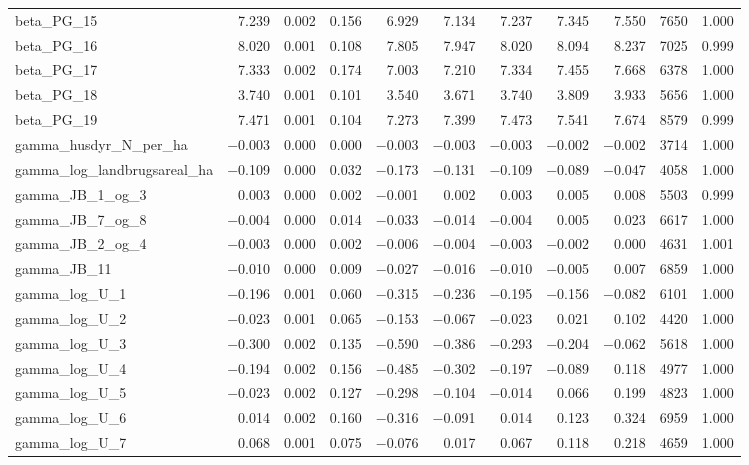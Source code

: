 \documentclass[12pt]{article}
\begin{document}
\begin{longtable}{lrrrrrrrrrr}
beta\_PG\_15 & 7.239 & 0.002 & 0.156 & 6.929 & 7.134 & 7.237 & 7.345 & 7.550 & 7650 & 1.000 \\
beta\_PG\_16 & 8.020 & 0.001 & 0.108 & 7.805 & 7.947 & 8.020 & 8.094 & 8.237 & 7025 & 0.999 \\
beta\_PG\_17 & 7.333 & 0.002 & 0.174 & 7.003 & 7.210 & 7.334 & 7.455 & 7.668 & 6378 & 1.000 \\
beta\_PG\_18 & 3.740 & 0.001 & 0.101 & 3.540 & 3.671 & 3.740 & 3.809 & 3.933 & 5656 & 1.000 \\
beta\_PG\_19 & 7.471 & 0.001 & 0.104 & 7.273 & 7.399 & 7.473 & 7.541 & 7.674 & 8579 & 0.999 \\
\addlinespace
gamma\_husdyr\_N\_per\_ha        & $-$0.003 & 0.000 & 0.000 & $-$0.003 & $-$0.003 & $-$0.003 & $-$0.002 & $-$0.002 & 3714 & 1.000 \\
gamma\_log\_landbrugsareal\_ha   & $-$0.109 & 0.000 & 0.032 & $-$0.173 & $-$0.131 & $-$0.109 & $-$0.089 & $-$0.047 & 4058 & 1.000 \\
gamma\_JB\_1\_og\_3  &  0.003 & 0.000 & 0.002 & $-$0.001 &  0.002 &  0.003 &  0.005 &  0.008 & 5503 & 0.999 \\
gamma\_JB\_7\_og\_8  & $-$0.004 & 0.000 & 0.014 & $-$0.033 & $-$0.014 & $-$0.004 &  0.005 &  0.023 & 6617 & 1.000 \\
gamma\_JB\_2\_og\_4  & $-$0.003 & 0.000 & 0.002 & $-$0.006 & $-$0.004 & $-$0.003 & $-$0.002 &  0.000 & 4631 & 1.001 \\
gamma\_JB\_11        & $-$0.010 & 0.000 & 0.009 & $-$0.027 & $-$0.016 & $-$0.010 & $-$0.005 &  0.007 & 6859 & 1.000 \\
gamma\_log\_U\_1  & $-$0.196 & 0.001 & 0.060 & $-$0.315 & $-$0.236 & $-$0.195 & $-$0.156 & $-$0.082 & 6101 & 1.000 \\
gamma\_log\_U\_2  & $-$0.023 & 0.001 & 0.065 & $-$0.153 & $-$0.067 & $-$0.023 &  0.021 &  0.102 & 4420 & 1.000 \\
gamma\_log\_U\_3  & $-$0.300 & 0.002 & 0.135 & $-$0.590 & $-$0.386 & $-$0.293 & $-$0.204 & $-$0.062 & 5618 & 1.000 \\
gamma\_log\_U\_4  & $-$0.194 & 0.002 & 0.156 & $-$0.485 & $-$0.302 & $-$0.197 & $-$0.089 &  0.118 & 4977 & 1.000 \\
gamma\_log\_U\_5  & $-$0.023 & 0.002 & 0.127 & $-$0.298 & $-$0.104 & $-$0.014 &  0.066 &  0.199 & 4823 & 1.000 \\
gamma\_log\_U\_6  &  0.014 & 0.002 & 0.160 & $-$0.316 & $-$0.091 &  0.014 &  0.123 &  0.324 & 6959 & 1.000 \\
gamma\_log\_U\_7  &  0.068 & 0.001 & 0.075 & $-$0.076 &  0.017 &  0.067 &  0.118 &  0.218 & 4659 & 1.000 \\

\end{longtable}
\end{document}
